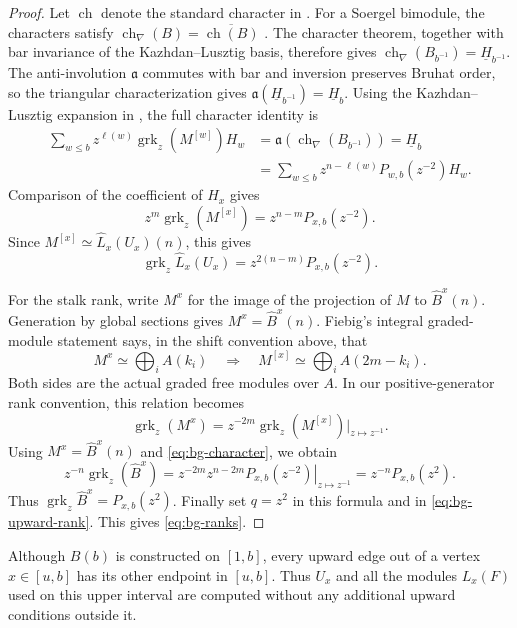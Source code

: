 \begin{proof}
Let $\operatorname{ch}$ denote the standard character in
\cite[Theorem~1.1]{EW14}.  For a Soergel bimodule, the characters satisfy
$\operatorname{ch}_{\nabla}(B)=\overline{\operatorname{ch}(B)}$
\cite[Section~3.5]{EW14}.  The character theorem, together with bar invariance of the
Kazhdan--Lusztig basis, therefore gives
$\operatorname{ch}_{\nabla}(B_{b^{-1}})=\underline H_{b^{-1}}$.
The anti-involution $\mathfrak a$ commutes with bar and inversion preserves
Bruhat order, so the triangular characterization gives
$\mathfrak a(\underline H_{b^{-1}})=\underline H_b$.
Using the Kazhdan--Lusztig expansion in \cite[Remark~3.2]{EW14}, the full
character identity is
\begin{align*}
 \sum_{w\le b}z^{\ell(w)}\operatorname{grk}_z(M^{[w]})H_w
 &=\mathfrak a(\operatorname{ch}_{\nabla}(B_{b^{-1}}))
   =\underline H_b\\
 &=\sum_{w\le b}z^{n-\ell(w)}P_{w,b}(z^{-2})H_w.
\end{align*}
Comparison of the coefficient of $H_x$ gives
\begin{equation}
\label{eq:bg-character}
 z^m\operatorname{grk}_z(M^{[x]})
   =z^{n-m}P_{x,b}(z^{-2}).
\end{equation}
Since $M^{[x]}\simeq\widehat L_x(U_x)(n)$, this gives
\begin{equation}
\label{eq:bg-upward-rank}
 \operatorname{grk}_z\widehat L_x(U_x)
 =z^{2(n-m)}P_{x,b}(z^{-2}).
\end{equation}

For the stalk rank, write $M^x$ for the image of the projection of $M$
to $\widehat B^x(n)$.  Generation by global sections gives
$M^x=\widehat B^x(n)$.
Fiebig's integral graded-module statement
\cite[Proposition~7.1(4), with Corollary~6.5]{Fiebig08} says, in the
shift convention above, that
\[
 M^x\simeq\bigoplus_i A(k_i)
 \quad\Longrightarrow\quad
 M^{[x]}\simeq\bigoplus_i A(2m-k_i).
\]
Both sides are the actual graded free modules over $A$.  In our
positive-generator rank convention, this relation becomes
\[
 \operatorname{grk}_z(M^x)
 =z^{-2m}\operatorname{grk}_z(M^{[x]})\big|_{z\mapsto z^{-1}}.
\]
Using $M^x=\widehat B^x(n)$ and \eqref{eq:bg-character}, we obtain
\[
 z^{-n}\operatorname{grk}_z(\widehat B^x)
 =z^{-2m}\left.z^{n-2m}P_{x,b}(z^{-2})\right|_{z\mapsto z^{-1}}
 =z^{-n}P_{x,b}(z^2).
\]
Thus $\operatorname{grk}_z\widehat B^x=P_{x,b}(z^2)$.
Finally set $q=z^2$ in this formula and in
\eqref{eq:bg-upward-rank}.  This gives \eqref{eq:bg-ranks}.
\end{proof}

\begin{remark}
\label{bg:upper-interval}
Although $B(b)$ is constructed on $[1,b]$, every upward edge out of a
vertex $x\in[u,b]$ has its other endpoint in $[u,b]$.  Thus $U_x$ and all
the modules $L_x(F)$ used on this upper interval are computed without any
additional upward conditions outside it.
\end{remark}
